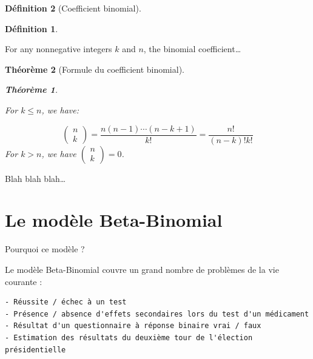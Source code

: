 \documentclass[
  a4paper,11pt,twoside,onecolumn,openright,final,oldfontcommands]{memoir}
\newtheorem{theorem}{Théorème}[chapter]
\theoremstyle{definition}
\newtheorem{definition}{Définition}[chapter]
\theoremstyle{definition}
\theoremstyle{definition}
\theoremstyle{remark}
\begin{document}
\begin{definition}[Coefficient binomial]
\begin{definition}
\protect\hypertarget{def:unlabeled-div-10}{}\label{def:unlabeled-div-10}

\protect\hypertarget{def:coefficient-binomial}{}{\label{def:coefficient-binomial} {} }For any nonnegative integers \(k\) and \(n\), the binomial coefficient\ldots{}

\end{definition}
\end{definition}

\begin{theorem}[Formule du coefficient binomial]
\begin{theorem}
\protect\hypertarget{thm:unlabeled-div-11}{}\label{thm:unlabeled-div-11}

\protect\hypertarget{thm:coefficient-binomial-formule}{}{\label{thm:coefficient-binomial-formule} {} }For \(k \leq n\), we have:

\[
\left(\begin{array}{l}n \\ k\end{array}\right)=\frac{n(n-1) \cdots(n-k+1)}{k !}=\frac{n !}{(n-k) ! k !}
\]
For \(k > n\), we have \(\left(\begin{array}{l}n \\ k\end{array}\right) = 0\).

\end{theorem}
\end{theorem}

\begin{note}
Blah blah blah\ldots{}
\end{note}

\hypertarget{le-moduxe8le-beta-binomial}{%
\section{Le modèle Beta-Binomial}\label{le-moduxe8le-beta-binomial}}

Pourquoi ce modèle ?

Le modèle Beta-Binomial couvre un grand nombre de problèmes de la vie courante :

\begin{verbatim}
- Réussite / échec à un test
- Présence / absence d'effets secondaires lors du test d'un médicament
- Résultat d'un questionnaire à réponse binaire vrai / faux 
- Estimation des résultats du deuxième tour de l'élection présidentielle 
\end{verbatim}
\end{document}
